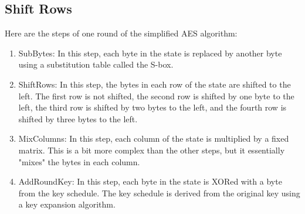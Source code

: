 \documentclass[11pt]{article}
\begin{document}
\subsection{Shift Rows}






Here are the steps of one round of the simplified AES algorithm:

\begin{enumerate}
	\item SubBytes: In this step, each byte in the state is replaced by another byte using a substitution table called the S-box.

	\item ShiftRows: In this step, the bytes in each row of the state are shifted to the left. The first row is not shifted, the second row is shifted by one byte to the left, the third row is shifted by two bytes to the left, and the fourth row is shifted by three bytes to the left.

	\item MixColumns: In this step, each column of the state is multiplied by a fixed matrix. This is a bit more complex than the other steps, but it essentially "mixes" the bytes in each column.

	\item AddRoundKey: In this step, each byte in the state is XORed with a byte from the key schedule. The key schedule is derived from the original key using a key expansion algorithm.
\end{enumerate}
\end{document}
